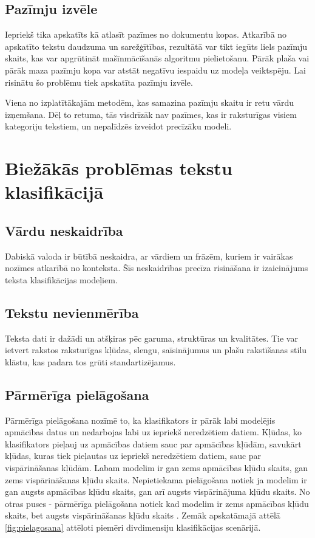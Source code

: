 \subsection{Pazīmju izvēle}
Iepriekš tika apskatīts kā atlasīt pazīmes no dokumentu kopas. Atkarībā no apskatīto tekstu daudzuma un sarežģītības, rezultātā var tikt iegūts liels pazīmju skaits, kas var apgrūtināt mašīnmācīšanās algoritmu pielietošanu. Pārāk plaša vai pārāk maza pazīmju kopa var atstāt negatīvu iespaidu uz modeļa veiktspēju. Lai risinātu šo problēmu tiek apskatīta pazīmju izvēle.

Viena no izplatītākajām metodēm, kas samazina pazīmju skaitu ir retu vārdu izņemšana. Dēļ to retuma, tās visdrīzāk nav pazīmes, kas ir raksturīgas visiem kategoriju tekstiem, un nepalīdzēs izveidot precīzāku modeli.

\section{Biežākās problēmas tekstu klasifikācijā}
\subsection{Vārdu neskaidrība}
 Dabiskā valoda ir būtībā neskaidra, ar vārdiem un frāzēm, kuriem ir vairākas nozīmes atkarībā no konteksta. Šīs neskaidrības precīza risināšana ir izaicinājums teksta klasifikācijas modeļiem.

\subsection{Tekstu nevienmērība}
Teksta dati ir dažādi un atšķiras pēc garuma, struktūras un kvalitātes. Tie var ietvert rakstos raksturīgas kļūdas, slengu, saīsinājumus un plašu rakstīšanas stilu klāstu, kas padara tos grūti standartizējamus.

\subsection{Pārmērīga pielāgošana}
Pārmērīga pielāgošana nozīmē to, ka klasifikators ir pārāk labi modelējis apmācības datus
un nedarbojas labi uz iepriekš neredzētiem datiem. Kļūdas, ko klasifikators pieļauj uz apmācības datiem sauc par apmācības kļūdām, savukārt kļūdas, kuras tiek pieļautas uz iepriekš neredzētiem datiem, sauc par vispārināšanas kļūdām. Labam modelim ir gan zems apmācības kļūdu skaits, gan zems vispārināšanas kļūdu skaits. Nepietiekama pielāgošana notiek ja modelim ir gan augsts apmācības kļūdu skaits, gan arī augsts vispārinājuma kļūdu skaits. No otras puses - pārmērīga pielāgošana notiek kad modelim ir zems apmācības kļūdu skaits, bet augsts vispārināšanas kļūdu skaits \cite{tan2005introduction}. Zemāk apskatāmajā attēlā \ref{fig:pielagosana} attēloti piemēri divdimensiju klasifikācijas scenārijā.

